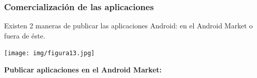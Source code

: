 \documentclass[12 pt, a4paper, twoside]{article}
\begin{document}



\subsubsection{Comercialización de las aplicaciones}
Existen 2 maneras de publicar las aplicaciones Android: en el Android Market
o fuera de éste.
\begin{center}
  \texttt{[image: img/figura13.jpg]}
\end{center}

\textbf{Publicar aplicaciones en el Android Market:}
\end{document}

